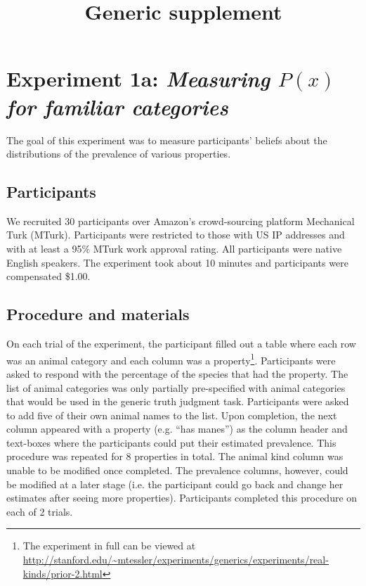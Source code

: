 \documentclass[10pt,letterpaper]{article}
\title{Generic supplement}
\begin{document}
\maketitle



\appendix


\section{Experiment 1a: \emph{Measuring $P(x)$ for familiar categories}}

The goal of this experiment was to measure participants' beliefs about the distributions of the prevalence of various properties.

\subsection{Participants}

We recruited 30 participants over Amazon's crowd-sourcing platform Mechanical Turk (MTurk).  Participants were restricted to those with US IP addresses and with at least a 95\% MTurk work approval rating. All participants were native English speakers. The experiment took about 10 minutes and participants were compensated \$1.00.

\subsection{Procedure and materials}

On each trial of the experiment, the participant filled out a table where each row was an animal category and each column was a property\footnote{The experiment in full can be viewed at \url{http://stanford.edu/~mtessler/experiments/generics/experiments/real-kinds/prior-2.html}}. 
Participants were asked to respond with the percentage of the species that had the property.
The list of animal categories was only partially pre-specified with animal categories that would be used in the generic truth judgment task.
Participants were asked to add five of their own animal names to the list. 
Upon completion, the next column appeared with a property (e.g. ``has manes'') as the column header and text-boxes where the participants could put their estimated prevalence. 
This procedure was repeated for 8 properties in total. 
The animal kind column was unable to be modified once completed. 
The prevalence columns, however, could be modified at a later stage (i.e. the participant could go back and change her estimates after seeing more properties). 
Participants completed this procedure on each of 2 trials.
\end{document}
